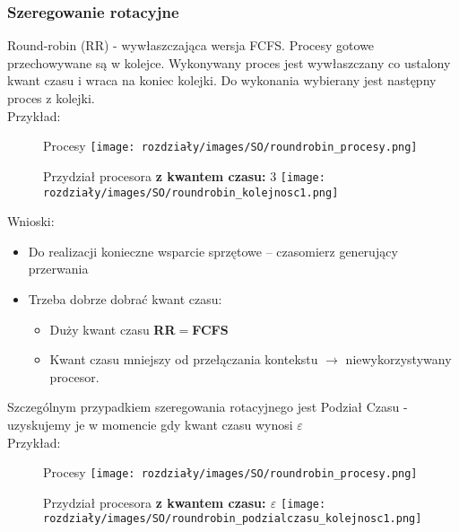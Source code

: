 \subsubsection{Szeregowanie rotacyjne}
    Round-robin (RR) - wywłaszczająca wersja FCFS. Procesy gotowe przechowywane są w kolejce. Wykonywany proces jest wywłaszczany co ustalony kwant czasu i wraca na koniec kolejki. Do wykonania wybierany jest następny proces z kolejki. \\

    Przykład:
    \begin{figure}[!htb]
        \begin{minipage}{0.2\textwidth}
            \centering
            Procesy
            \texttt{[image: rozdziały/images/SO/roundrobin\_procesy.png]}
        \end{minipage}\hfill
        \begin{minipage}{0.7\textwidth}
            \centering
            Przydział procesora \textbf{z kwantem czasu:} 3
            \texttt{[image: rozdziały/images/SO/roundrobin\_kolejnosc1.png]}
        \end{minipage}
    \end{figure}

    Wnioski:
    \begin{itemize}
        \item Do realizacji konieczne wsparcie sprzętowe – czasomierz generujący przerwania
        \item Trzeba dobrze dobrać kwant czasu:
            \begin{itemize}
                \item Duży kwant czasu \textbf{RR}$=$\textbf{FCFS}
                \item Kwant czasu mniejszy od przełączania kontekstu $\rightarrow$ niewykorzystywany procesor.
            \end{itemize}
    \end{itemize}
    
    Szczególnym przypadkiem szeregowania rotacyjnego jest Podział Czasu - uzyskujemy je w momencie gdy kwant czasu wynosi $\varepsilon$ \\

    Przykład:
    \begin{figure}[!htb]
        \begin{minipage}{0.2\textwidth}
            \centering
            Procesy
            \texttt{[image: rozdziały/images/SO/roundrobin\_procesy.png]}
        \end{minipage}\hfill
        \begin{minipage}{0.7\textwidth}
            \centering
            Przydział procesora \textbf{z kwantem czasu: $\varepsilon$}
            \texttt{[image: rozdziały/images/SO/roundrobin\_podzialczasu\_kolejnosc1.png]}
        \end{minipage}
    \end{figure}

